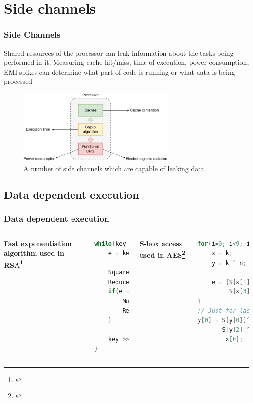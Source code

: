 \documentclass[10pt]{beamer}
\begin{document}
\section{Side channels}

\begin{frame}
\frametitle{Side Channels}

Shared resources of the processor can leak information about the tasks being performed in it.
Measuring cache hit/miss, time of execution, power consumption, EMI spikes can determine what part of
code is running or what data is being processed

\begin{figure}[h]
    \centering
    \includegraphics[width=0.7\textwidth]{side_channel.png}
    \caption[Data leakage sources]{A number of side channels which are capable of leaking data.}
    \label{fig:dls}
\end{figure}
\end{frame}

\subsection{Data dependent execution}
\begin{frame}[fragile]
\frametitle{Data dependent execution}

\begin{columns}[t]
        \textbf{Fast exponentiation algorithm used in RSA\footnote[frame]{\cite{cache_missing}}}
        \begin{lstlisting}[language={C}]
while(key > 0) {
    e = key % 2;

    Square();
    Reduce();
    if(e == 1) {
        Multiply();
        Reduce();
    }

    key >>= 1;
}
        \end{lstlisting}
        \textbf{S-box access used in AES\footnote[frame]{\cite{bern}}}
        \begin{lstlisting}[language={C}]
for(i=0; i<9; i++) {
    x = k;
    y = k ^ n;

    e = {S[x[1]]^1, S[x[2]],
         S[x[3]], S[x[0]]};
}
// Just for last round
y[0] = S[y[0]]^S[y[1]]^
       S[y[2]]^S[y[3]]^
        x[0];
        \end{lstlisting}
\end{columns}
\end{frame}
\end{document}
